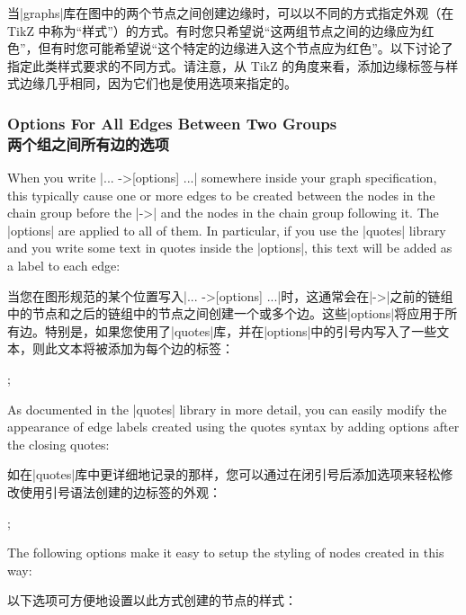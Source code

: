 当|graphs|库在图中的两个节点之间创建边缘时，可以以不同的方式指定外观（在TikZ 中称为“样式”）的方式。有时您只希望说“这两组节点之间的边缘应为红色”，但有时您可能希望说“这个特定的边缘进入这个节点应为红色”。以下讨论了指定此类样式要求的不同方式。请注意，从 TikZ 的角度来看，添加边缘标签与样式边缘几乎相同，因为它们也是使用选项来指定的。

\subsubsection{Options For All Edges Between Two Groups\\两个组之间所有边的选项}

When you write |... ->[options] ...| somewhere inside your graph specification,
this typically cause one or more edges to be created between the nodes in the
chain group before the |->| and the nodes in the chain group following it. The
|options| are applied to all of them. In particular, if you use the |quotes|
library and you write some text in quotes inside the |options|, this text will
be added as a label to each edge:

当您在图形规范的某个位置写入|... ->[options] ...|时，这通常会在|->|之前的链组中的节点和之后的链组中的节点之间创建一个或多个边。这些|options|将应用于所有边。特别是，如果您使用了|quotes|库，并在|options|中的引号内写入了一些文本，则此文本将被添加为每个边的标签：

\begin{codeexample}[preamble={\usetikzlibrary{graphs,quotes}}]
\tikz
  ;
\end{codeexample}

As documented in the |quotes| library in more detail, you can easily modify the
appearance of edge labels created using the quotes syntax by adding options
after the closing quotes:

如在|quotes|库中更详细地记录的那样，您可以通过在闭引号后添加选项来轻松修改使用引号语法创建的边标签的外观：

\begin{codeexample}[preamble={\usetikzlibrary{graphs,quotes}}]
\tikz {};
\end{codeexample}

The following options make it easy to setup the styling of nodes created in
this way:

以下选项可方便地设置以此方式创建的节点的样式：

